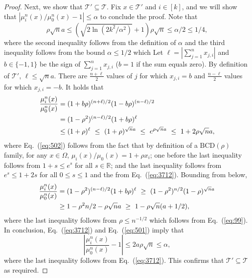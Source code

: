 \documentclass[final, 12pt]{colt2018}
\providecommand{\BCD}{\mathrm{BCD}}
\renewcommand{\eqref}[1]{Eq.~(\ref{#1})}
\begin{document}
\begin{proof}
Next, we show that $\mathcal{T}' \subseteq \mathcal{T}$. Fix $x \in \mathcal{T}'$ and $i \in [k]$, and we will show that $\left\lvert \mu_i^n(x)/\mu_0^n(x) -1 \right\vert\le \alpha$ to conclude the proof.
Note that
\begin{equation} \label{eq:3712}
\rho \sqrt{n} a 
\le \left( \sqrt{2\ln(2k^2/\alpha^2)} + 1 \right) \rho \sqrt{n}
\le \alpha/2
\le 1/4,
\end{equation}
where the second inequality follows from the definition of $\alpha$ and the third inequality follows from the bound $\alpha\le 1/2$ which 
Let $\ell = \left\lvert \sum_{j=1}^n x_{j,i} \right\rvert$ and $b \in \{-1,1\}$ be the sign of $\sum_{j=1}^n x_{j,i}$ ($b=1$ if the sum equals zero). By definition of $\mathcal{T}'$, $\ell \le \sqrt{n}a$. There are $\frac{n+\ell}{2}$ values of $j$ for which $x_{j,i}=b$ and $\frac{n-\ell}{2}$ values for which $x_{j,i} = -b$. 
It holds that
\begin{align}
\frac{\mu_i^n(x)}{\mu_0^n(x)} 
&= (1+b\rho)^{(n+\ell)/2} (1-b\rho)^{(n-\ell)/2} \label{eq:502}\\
&= (1 - \rho^2)^{(n-\ell)/2} (1+ b\rho)^\ell \notag\\
&\le (1+ \rho)^\ell 
~\le~ (1 + \rho)^{\sqrt{n}a} 
~\le~ e^{\rho \sqrt{n}a} 
~\le~ 1 + 2 \rho \sqrt{n}a, \notag
\end{align}
where \eqref{eq:502} follows from the fact that by definition of a $\BCD(\rho)$ family, for any $x \in \Omega$, $\mu_i(x)/\mu_0(x) = 1 + \rho x_i$; one before the last inequality follows from $1+s \le e^s$ for all $s \in \mathbb{R}$;
and the last inequality follows from $e^s \le 1 + 2s$ for all $0 \le s \le 1$ and the from \eqref{eq:3712}.
Bounding from below,
\begin{align}
\frac{\mu_i^n(x)}{\mu_0^n(x)} 
&= (1 - \rho^2)^{(n-\ell)/2} (1+ b\rho)^\ell 
~\ge~ (1 - \rho^2)^{n/2} (1 - \rho)^{\sqrt{n}a} \notag\\
&\ge 1 - \rho^2 n/2 - \rho \sqrt{n} a 
~\ge~ 1 - \rho \sqrt{n} (a + 1/2), \label{eq:501}
\end{align}
where the last inequality follows from $\rho \le n^{-1/2}$ which follows from \eqref{eq:99}.
In conclusion, \eqref{eq:3712} and \eqref{eq:501} imply that 
\begin{equation} \label{eq:55}
\left\lvert \frac{\mu_i^n(x)}{\mu_0^n(x)} -1 \right\rvert
\le 2 a \rho \sqrt{n}
\le \alpha,
\end{equation}
where the last inequality follows from \eqref{eq:3712}. This confirms that $\mathcal{T}' \subseteq \mathcal{T}$ as required.
\end{proof}
\end{document}
